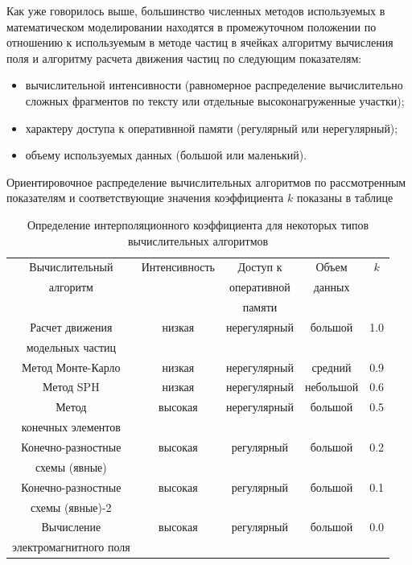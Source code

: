 Как уже говорилось выше, большинство численных методов используемых в математическом моделировании находятся в промежуточном положении по отношению к используемым в методе частиц в ячейках алгоритму вычисления поля и алгоритму расчета движения частиц по следующим показателям:
\begin{itemize}
	\item вычислительной интенсивности (равномерное распределение вычислительно сложных фрагментов по тексту или отдельные высоконагруженные участки);
	\item характеру доступа к оперативнной памяти (регулярный или нерегулярный);
	\item объему используемых данных (большой или маленький).
\end{itemize}
Ориентировочное распределение вычислительных алгоритмов по рассмотренным показателям и соответствующие значения коэффициента $k$ показаны в таблице 


\begin{table}[ht]
	\begin{center}
		\caption{Определение интерполяционного коэффициента для некоторых типов вычислительных алгоритмов}
		\begin{tabular}{|c|c|c|c|c|}
			\hline
			Вычислительный    & Интенсивность &  Доступ к           & Объем  & $k$  \\ 
			алгоритм          &               &  оперативной  & данных &  \\
			&               &  памяти       &        &  \\ \hline
			Расчет движения   &  низкая       & нерегулярный        & большой & 1.0 \\ 
			модельных частиц  &               &                     &          & \\\hline
			Метод Монте-Карло &  низкая       & нерегулярный        & средний & 0.9 \\ \hline
			Метод SPH         &  низкая       & нерегулярный        & небольшой & 0.6 \\ \hline	Метод             &  высокая      & нерегулярный        & большой & 0.5  \\
			конечных элементов &          &              &         & \\ \hline
			Конечно-разностные &  высокая  & регулярный & большой & 0.2 \\ 		
			схемы (явные)      &           &            &         &     \\\hline
			Конечно-разностные &  высокая  & регулярный & большой & 0.1 \\ 		
			схемы (явные)-2    &           &            &         &     \\\hline
			Вычисление         &  высокая  & регулярный & большой & 0.0 \\ 		
			электромагнитного поля      &           &            &         &     \\\hline
			
			
		\end{tabular} 
		\label{tab-interp-koef}              
	\end{center}
\end{table}


